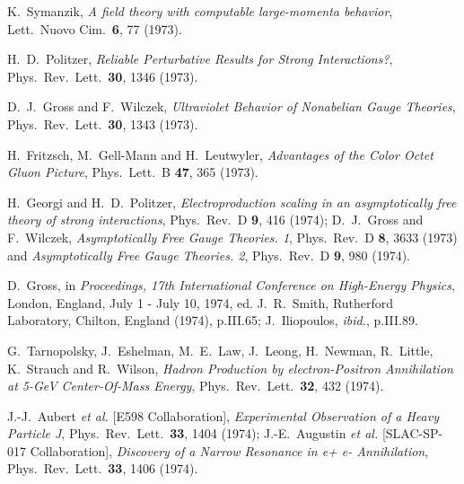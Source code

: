 \documentclass{ws-rv975x65}[12pt]
\begin{document}
\begin{thebibliography}{9}
K.~Symanzik,
{\it A field theory with computable large-momenta behavior},
Lett.\ Nuovo Cim.\  {\bf 6}, 77 (1973).

H.~D.~Politzer,
{\it Reliable Perturbative Results for Strong Interactions?},
  Phys.\ Rev.\ Lett.\  {\bf 30}, 1346 (1973).

D.~J.~Gross and F.~Wilczek,
{\it Ultraviolet Behavior of Nonabelian Gauge Theories},
  Phys.\ Rev.\ Lett.\  {\bf 30}, 1343 (1973).
  
H.~Fritzsch, M.~Gell-Mann and H.~Leutwyler,
{\it Advantages of the Color Octet Gluon Picture},
  Phys.\ Lett.\ B {\bf 47}, 365 (1973).

H.~Georgi and H.~D.~Politzer,
{\it Electroproduction scaling in an asymptotically free theory of strong interactions},
  Phys.\ Rev.\ D {\bf 9}, 416 (1974);
D.~J.~Gross and F.~Wilczek,
{\it Asymptotically Free Gauge Theories. 1},
  Phys.\ Rev.\ D {\bf 8}, 3633 (1973) and
{\it Asymptotically Free Gauge Theories. 2},
  Phys.\ Rev.\ D {\bf 9}, 980 (1974).

D.~Gross, in {\it Proceedings, 17th International Conference on High-Energy Physics}, London, England, July 1 - July 10, 1974,
ed. J.~R.~Smith, Rutherford Laboratory, Chilton, England (1974), p.III.65;
J.~Iliopoulos, {\it ibid.}, p.III.89.

G.~Tarnopolsky, J.~Eshelman, M.~E.~Law, J.~Leong, H.~Newman, R.~Little, K.~Strauch and R.~Wilson,
{\it Hadron Production by electron-Positron Annihilation at 5-GeV Center-Of-Mass Energy},
  Phys.\ Rev.\ Lett.\  {\bf 32}, 432 (1974).

J.-J.~Aubert {\it et al.}  [E598 Collaboration],
{\it Experimental Observation of a Heavy Particle J},
  Phys.\ Rev.\ Lett.\  {\bf 33}, 1404 (1974);
  J.-E.~Augustin {\it et al.}  [SLAC-SP-017 Collaboration],
{\it Discovery of a Narrow Resonance in e+ e- Annihilation},
  Phys.\ Rev.\ Lett.\  {\bf 33}, 1406 (1974).


\end{thebibliography}
\end{document}
